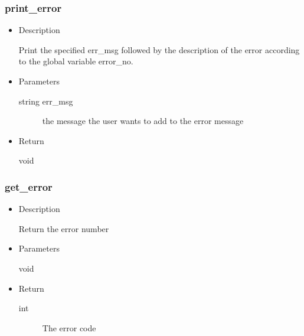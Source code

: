 \subsubsection{print\_error}
\begin{itemize}
  \item{Description}

	 Print the specified err\_msg followed by the description of the
	 error according to the global variable error\_no.
  \item{Parameters}
	 \begin{description}
		\item[string err\_msg] the message the user wants to add to the error message
	 \end{description}
  \item{Return}
	 \begin{description}
		\item[void]
	 \end{description}
\end{itemize}


\subsubsection{get\_error}
\begin{itemize}
  \item{Description}

	 Return the error number
  \item{Parameters}
	 \begin{description}
		\item[void]
	 \end{description}
  \item{Return}
	 \begin{description}
		\item[int] The error code
	 \end{description}
\end{itemize}

